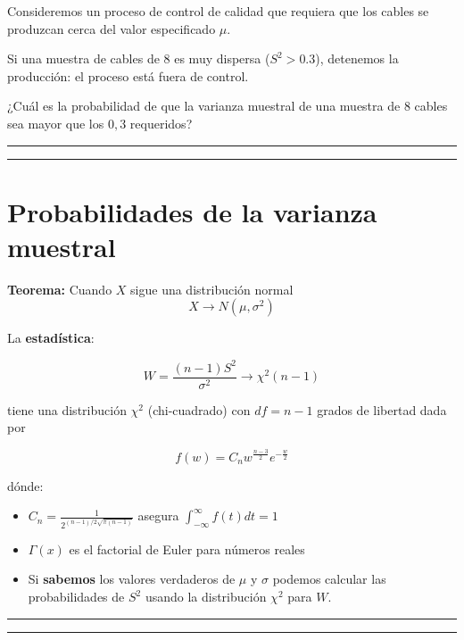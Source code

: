 \documentclass[
]{book}
\begin{document}
Consideremos un proceso de control de calidad que requiera que los cables se produzcan cerca del valor especificado \(\mu\).

Si una muestra de cables de \(8\) es muy dispersa (\(S^2>0.3\)), detenemos la producción: el proceso está fuera de control.

¿Cuál es la probabilidad de que la varianza muestral de una muestra de \(8\) cables sea mayor que los \(0,3\) requeridos?

\begin{center}\rule{0.5\linewidth}{0.5pt}\end{center}

\begin{center}\rule{0.5\linewidth}{0.5pt}\end{center}

\hypertarget{probabilidades-de-la-varianza-muestral}{%
\section{Probabilidades de la varianza muestral}\label{probabilidades-de-la-varianza-muestral}}

\textbf{Teorema:} Cuando \(X\) sigue una distribución normal
\[X \rightarrow N(\mu, \sigma^2)\]

La \textbf{estadística}:

\[W=\frac{(n-1)S^2}{\sigma^2} \rightarrow \chi^2(n-1)\]

tiene una distribución \(\chi^2\) (chi-cuadrado) con \(df=n-1\) grados de libertad dada por

\[f(w)=C_n w^{\frac{n-3}{2}} e^{-\frac{w}{2}}\]

dónde:

\begin{itemize}
\item
  \(C_n=\frac{1}{2^{(n-1)/2\sqrt{\pi(n-1)}}}\) asegura \(\int_{-\infty}^{\infty} f( t)dt=1\)
\item
  \(\Gamma(x)\) es el factorial de Euler para números reales
\item
  Si \textbf{sabemos} los valores verdaderos de \(\mu\) y \(\sigma\) podemos calcular las probabilidades de \(S^2\) usando la distribución \(\chi^2\) para \(W\).
\end{itemize}

\begin{center}\rule{0.5\linewidth}{0.5pt}\end{center}

\begin{center}\rule{0.5\linewidth}{0.5pt}\end{center}
\end{document}
